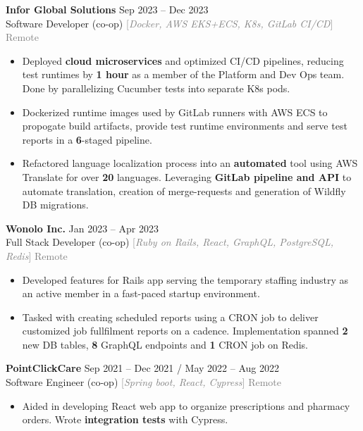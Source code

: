 \documentclass[9pt]{developercv} %
\begin{document}
\begin{minipage}[t]{\textwidth}
	\textbf{Infor Global Solutions} \hfill Sep 2023 -- Dec 2023 \\
	Software Developer (co-op) \quad \textcolor{gray}{[\;\textit{Docker, AWS EKS+ECS, K8s, GitLab CI/CD}\;]} \hfill \textcolor{gray}{Remote}
	\begin{itemize}[noitemsep,topsep=0pt]
		\item Deployed \textbf{cloud microservices} and optimized CI/CD pipelines,
		reducing test runtimes by \textbf{1 hour} as a member of the Platform and Dev Ops team.
		Done by parallelizing Cucumber tests into separate K8s pods.
		\item Dockerized runtime images used by GitLab runners with AWS ECS to propogate build artifacts, provide test runtime
		environments and serve test reports in a \textbf{6}-staged pipeline.
		\item Refactored language localization process into an \textbf{automated} tool using
		AWS Translate for over \textbf{20} languages. Leveraging \textbf{GitLab pipeline and API}
		to automate translation, creation of merge-requests and generation of Wildfly DB migrations.
	\end{itemize}
	\vspace{0.3em}

	\textbf{Wonolo Inc.} \hfill Jan 2023 -- Apr 2023 \\
	Full Stack Developer (co-op) \quad \textcolor{gray}{[\;\textit{Ruby on Rails, React, GraphQL, PostgreSQL, Redis}\;]} \hfill \textcolor{gray}{Remote}
	\begin{itemize}[noitemsep,topsep=0pt]
		\item Developed features for Rails app serving the temporary staffing industry as an active member in a fast-paced startup environment.
		\item Tasked with creating scheduled reports using a CRON job to deliver customized job fullfilment reports on a cadence.
		Implementation spanned \textbf{2} new DB tables, \textbf{8} GraphQL endpoints and \textbf{1} CRON job on Redis.
	\end{itemize}
	\vspace{0.3em}

	\textbf{PointClickCare} \hfill Sep 2021 -- Dec 2021 / May 2022 -- Aug 2022 \\
	Software Engineer (co-op) \quad \textcolor{gray}{[\;\textit{Spring boot, React, Cypress}\;]} \hfill \textcolor{gray}{Remote}
	\begin{itemize}[noitemsep,topsep=0pt]
		\item Aided in developing React web app to organize prescriptions and pharmacy orders.
		Wrote \textbf{integration tests} with Cypress.


\end{itemize}
\end{minipage}
\end{document}
